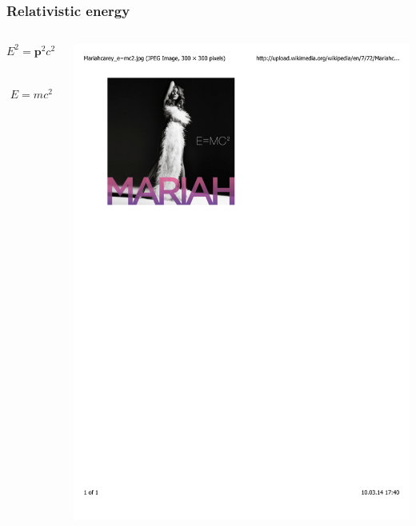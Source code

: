 \documentclass[mathserif,10pt]{beamer}
\begin{document}
\begin{frame}
    \frametitle{Relativistic energy}
    \begin{columns}
    \begin{column}{.50\textwidth}
	\begin{equation}
	    \nonumber
	    E^2 = \boldsymbol{p}^2c^2 + m^2c^4
	\end{equation}
	\ \\
	\ \\
	\begin{equation}
	    \nonumber
	    E = mc^2
	\end{equation}
    \end{column}
    \begin{column}{.50\textwidth}
	\centering
	\includegraphics[viewport = 60 560 285 800, clip, scale=0.4]{figures/mariah.pdf}
    \end{column}
    \end{columns}
\end{frame}
\end{document}
